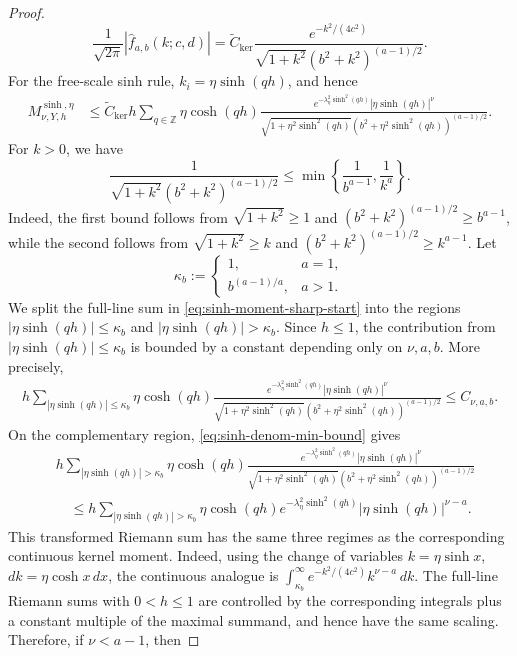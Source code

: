 \documentclass[10pt,reqno]{article}
\numberwithin{equation}{section}
\theoremstyle{plain}
\theoremstyle{definition}
\begin{document}
\begin{proof}
\begin{equation}\label{eq:sinh-kernel-sharp-majorant}
\frac{1}{\sqrt{2\pi}}|\hat f_{a,b}(k;c,d)|=\widetilde C_{\operatorname{ker}}\frac{e^{-k^2/(4c^2)}}{\sqrt{1+k^2}(b^2+k^2)^{(a-1)/2}}.
\end{equation}
For the free-scale sinh rule, \(k_i=\eta\sinh(qh)\), and hence
\begin{align}
M_{\nu,Y,h}^{\operatorname{sinh},\eta} &\le \widetilde C_{\operatorname{ker}}h\sum_{q\in\mathbb Z}\eta\cosh(qh)\frac{e^{-\lambda_\eta^2\sinh^2(qh)}|\eta\sinh(qh)|^\nu}{\sqrt{1+\eta^2\sinh^2(qh)}\left(b^2+\eta^2\sinh^2(qh)\right)^{(a-1)/2}}.
\label{eq:sinh-moment-sharp-start}
\end{align}
For \(k>0\), we have
\begin{equation}\label{eq:sinh-denom-min-bound}
\frac{1}{\sqrt{1+k^2}(b^2+k^2)^{(a-1)/2}}\le \min\left\{\frac{1}{b^{a-1}},\frac{1}{k^a}\right\}.
\end{equation}
Indeed, the first bound follows from \(\sqrt{1+k^2}\ge1\) and \((b^2+k^2)^{(a-1)/2}\ge b^{a-1}\), while the second follows from \(\sqrt{1+k^2}\ge k\) and \((b^2+k^2)^{(a-1)/2}\ge k^{a-1}\). Let
\begin{equation}\label{eq:sinh-kappa-b-def}
\kappa_b:=\begin{cases}1, & a=1,\\ b^{(a-1)/a}, & a>1.\end{cases}
\end{equation}
We split the full-line sum in \cref{eq:sinh-moment-sharp-start} into the regions \(|\eta\sinh(qh)|\le\kappa_b\) and \(|\eta\sinh(qh)|>\kappa_b\). Since \(h\le1\), the contribution from \(|\eta\sinh(qh)|\le\kappa_b\) is bounded by a constant depending only on \(\nu,a,b\). More precisely,
\begin{align}
h\sum_{|\eta\sinh(qh)|\le\kappa_b}\eta\cosh(qh)\frac{e^{-\lambda_\eta^2\sinh^2(qh)}|\eta\sinh(qh)|^\nu}{\sqrt{1+\eta^2\sinh^2(qh)}\left(b^2+\eta^2\sinh^2(qh)\right)^{(a-1)/2}} \le C_{\nu,a,b}.
\end{align}
On the complementary region, \cref{eq:sinh-denom-min-bound} gives
\begin{align}
&h\sum_{|\eta\sinh(qh)|>\kappa_b}\eta\cosh(qh)\frac{e^{-\lambda_\eta^2\sinh^2(qh)}|\eta\sinh(qh)|^\nu}{\sqrt{1+\eta^2\sinh^2(qh)}\left(b^2+\eta^2\sinh^2(qh)\right)^{(a-1)/2}} \\
&\quad\le h\sum_{|\eta\sinh(qh)|>\kappa_b}\eta\cosh(qh)e^{-\lambda_\eta^2\sinh^2(qh)}|\eta\sinh(qh)|^{\nu-a}.
\end{align}
This transformed Riemann sum has the same three regimes as the corresponding continuous kernel moment. Indeed, using the change of variables \(k=\eta\sinh x\), \(dk=\eta\cosh x\,dx\), the continuous analogue is \(\int_{\kappa_b}^{\infty}e^{-k^2/(4c^2)}k^{\nu-a}\,dk\). The full-line Riemann sums with \(0<h\le1\) are controlled by the corresponding integrals plus a constant multiple of the maximal summand, and hence have the same scaling. Therefore, if \(\nu<a-1\), then

\end{proof}
\end{document}
